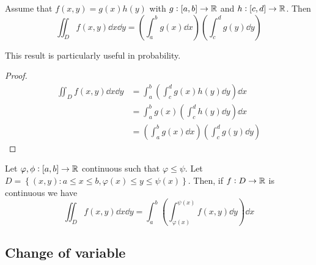 \documentclass[12pt]{extarticle}
\begin{document}
\begin{corollary}
    Assume that $f(x, y) = g(x)h(y)$ with $g:[a,b] \to \mathbb{R}$ and $h:[c,d] \to \mathbb{R}$.
    Then
    \begin{equation}
        \iint_D f(x, y) \dd{x}\dd{y} = \left(\int_a^b g(x)\dd{x}\right) \left(\int_c ^d g(y)\dd{y}\right)
    \end{equation}

    This result is particularly useful in probability.
\end{corollary}

\begin{proof}
    \begin{align}
        \iint_D f(x, y) \dd{x}\dd{y} & = \int_a^b \left(\int_c^d g(x)h(y) \dd{y}\right) \dd{x}              \\
                                     & = \int_a^b g(x) \left(\int_c^d h(y) \dd{y}\right) \dd{x}             \\
                                     & = \left(\int_a^b g(x)\dd{x}\right) \left(\int_c ^d g(y)\dd{y}\right)
    \end{align}
\end{proof}

\begin{theorem}
    Let $\varphi, \phi: [a, b] \to \mathbb{R}$ continuous such that $\varphi \leq \psi$.
    Let $D = \left\{ (x, y) : a \leq x \leq b, \varphi(x) \leq y \leq \psi(x) \right\}$.
    Then, if $f: D \to \mathbb{R}$ is continuous we have
    \begin{equation}
        \iint_D f(x, y) \dd{x} \dd{y} = \int_a^b \left(\int_{\varphi(x)}^{\psi(x)} f(x, y) \dd{y}\right) \dd{x}
    \end{equation}
\end{theorem}

\subsection{Change of variable}
\end{document}
